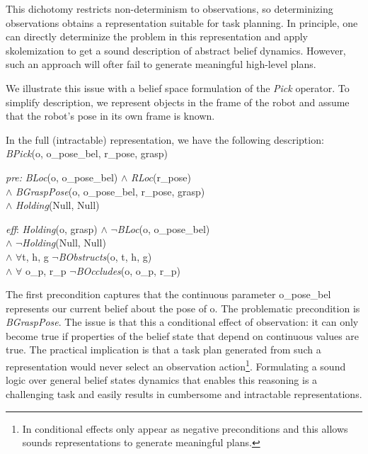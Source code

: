 This dichotomy restricts non-determinism to observations, so
determinizing observations obtains a representation suitable for task
planning. In principle, one can directly determinize the problem in
this representation and apply skolemization to get a sound description
of abstract belief dynamics. However, such an approach will ofter fail
to generate meaningful high-level plans.

We illustrate this issue with a belief space formulation of the
\emph{Pick} operator. To simplify description, we represent objects in
the frame of the robot and assume that the robot's pose in its own
frame is known.

In the full (intractable) representation, we have the following
description:\\ 
\emph{BPick}(o, o\_pose\_bel, r\_pose, grasp)
\begin{tightlist}
\item[\emph{pre:}] \emph{BLoc}(o, o\_pose\_bel) $\wedge$
  \emph{RLoc}(r\_pose) \\$\wedge$ \emph{BGraspPose}(o, o\_pose\_bel,
  r\_pose, grasp) \\$\wedge$ \emph{Holding}(Null, Null)
\item[\emph{eff}:] \emph{Holding}(o, grasp) $\wedge$
  $\lnot$\emph{BLoc}(o, o\_pose\_bel) \\$\wedge$
  $\lnot$\emph{Holding}(Null, Null) \\$\wedge$ $\forall$t, h, g
  $\lnot$\emph{BObstructs}(o, t, h, g)\\$\wedge$ $\forall$ o\_p,
  r\_p $\lnot$\emph{BOccludes}(o, o\_p, r\_p)
\end{tightlist}
The first precondition captures that the continuous parameter
o\_pose\_bel represents our current belief about the pose of o. The
problematic precondition is \emph{BGraspPose}. The issue is that this
a conditional effect of observation: it can only become true if
properties of the belief state that depend on continuous values are
true. The practical implication is that a task plan generated from
such a representation would never select an observation
action\footnote{In \cite{srivastava2014combined} conditional effects
  only appear as negative preconditions and this allows sounds
  representations to generate meaningful plans.}. Formulating a sound
logic over general belief states dynamics that enables this reasoning
is a challenging task and easily results in cumbersome and intractable
representations.

